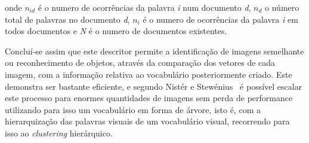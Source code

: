 onde $n_{id}$ é o numero de ocorrências da palavra \textit{i} num documento \textit{d}, $n_{d}$ o número total de palavras no documento \textit{d}, $n_{i}$ é o numero de ocorrências da palavra \textit{i} em todos documentos e \textit{N} é o numero de documentos existentes. 

Concluí-se assim que este descritor permite a identificação de imagens semelhante ou reconhecimento de objetos, através da comparação dos vetores de cada imagem, com a informação relativa ao vocabulário posteriormente criado. Este demonstra ser bastante eficiente, e segundo Nistér e Stewénius~\cite{Nister2006} é possível escalar este processo para enormes quantidades de imagens sem perda de performance utilizando para isso um vocabulário em forma de árvore, isto é, com a hierarquização das palavras visuais de um vocabulário visual, recorrendo para isso ao \textit{clustering} hierárquico.

%


